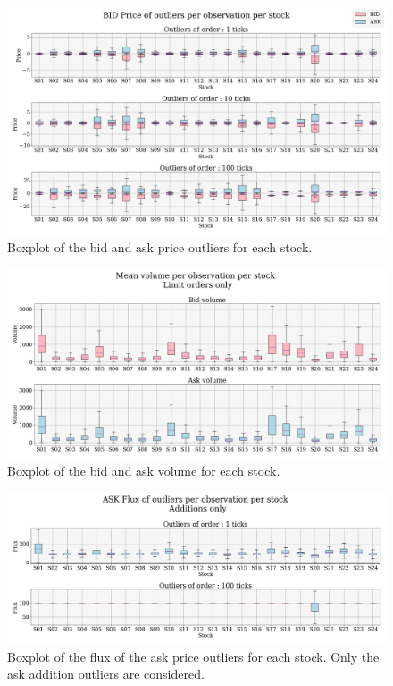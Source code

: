 \documentclass[switch, 11pt]{article}
\begin{document}
\begin{figure}[H]
    \centering
    \includegraphics[width=\columnwidth]{figures/boxplot_price_outliers_BID_ASK.png}
    \caption{Boxplot of the bid and ask price outliers for each stock.}
    \label{fig:boxplot_price_outliers_bid_ask}
\end{figure}

\begin{figure}[H]
    \centering
    \includegraphics[width=\columnwidth]{figures/boxplot_volume_per_stock.png}
    \caption{Boxplot of the bid and ask volume for each stock.}
    \label{fig:volume}
\end{figure}

\begin{figure}[H]
    \centering
    \includegraphics[width=\columnwidth]{figures/boxplot_flux_outliers_ASK.png}
    \caption{Boxplot of the flux of the ask price outliers for each stock. Only the ask addition outliers are considered.}
    \label{fig:flux_ask_add}
\end{figure}
\end{document}
